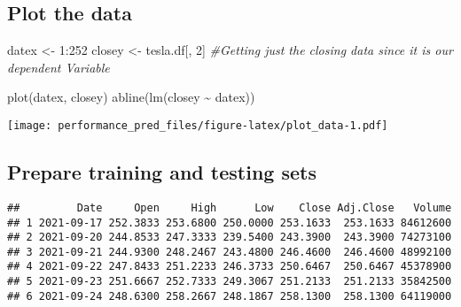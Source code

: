 \documentclass[
]{article}
\newenvironment{Shaded}{\begin{snugshade}}{\end{snugshade}}
\newcommand{\AttributeTok}[1]{\textcolor[rgb]{0.77,0.63,0.00}{#1}}
\newcommand{\CommentTok}[1]{\textcolor[rgb]{0.56,0.35,0.01}{\textit{#1}}}
\newcommand{\DecValTok}[1]{\textcolor[rgb]{0.00,0.00,0.81}{#1}}
\newcommand{\FloatTok}[1]{\textcolor[rgb]{0.00,0.00,0.81}{#1}}
\newcommand{\FunctionTok}[1]{\textcolor[rgb]{0.00,0.00,0.00}{#1}}
\newcommand{\NormalTok}[1]{#1}
\newcommand{\OtherTok}[1]{\textcolor[rgb]{0.56,0.35,0.01}{#1}}
\newcommand{\SpecialCharTok}[1]{\textcolor[rgb]{0.00,0.00,0.00}{#1}}
\begin{document}
\hypertarget{plot-the-data}{%
\subsection{Plot the data}\label{plot-the-data}}

\begin{Shaded}
\begin{Highlighting}[]
\NormalTok{datex }\OtherTok{\textless{}{-}} \DecValTok{1}\SpecialCharTok{:}\DecValTok{252} 
\NormalTok{closey }\OtherTok{\textless{}{-}}\NormalTok{ tesla.df[, }\DecValTok{2}\NormalTok{] }\CommentTok{\#Getting just the closing data since it is our dependent Variable}

\FunctionTok{plot}\NormalTok{(datex, closey)}
\FunctionTok{abline}\NormalTok{(}\FunctionTok{lm}\NormalTok{(closey }\SpecialCharTok{\textasciitilde{}}\NormalTok{ datex))}
\end{Highlighting}
\end{Shaded}

\texttt{[image: performance\_pred\_files/figure-latex/plot\_data-1.pdf]}

\hypertarget{prepare-training-and-testing-sets}{%
\subsection{Prepare training and testing
sets}\label{prepare-training-and-testing-sets}}

\begin{Shaded}
\end{Shaded}

\begin{verbatim}
##         Date     Open     High      Low    Close Adj.Close   Volume
## 1 2021-09-17 252.3833 253.6800 250.0000 253.1633  253.1633 84612600
## 2 2021-09-20 244.8533 247.3333 239.5400 243.3900  243.3900 74273100
## 3 2021-09-21 244.9300 248.2467 243.4800 246.4600  246.4600 48992100
## 4 2021-09-22 247.8433 251.2233 246.3733 250.6467  250.6467 45378900
## 5 2021-09-23 251.6667 252.7333 249.3067 251.2133  251.2133 35842500
## 6 2021-09-24 248.6300 258.2667 248.1867 258.1300  258.1300 64119000
\end{verbatim}
\end{document}
